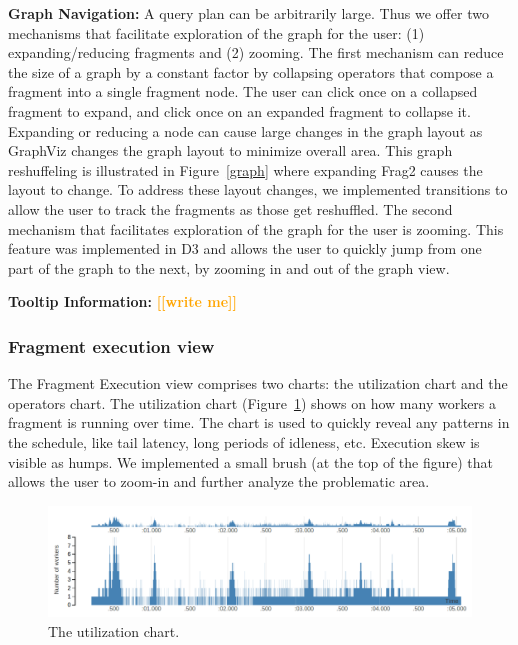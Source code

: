 \documentclass{chi2009}
\newcommand*{\fragment}{Fragment Execution\xspace}
\newcommand{\todo}[1]{\textsf{\textbf{\textcolor{Orange}{[[#1]]}}}}
\begin{document}
\textbf{Graph Navigation:} A query plan can be arbitrarily large. Thus we offer two mechanisms that facilitate exploration of the graph for the user: (1) expanding/reducing fragments and (2) zooming. The first mechanism can reduce the size of a graph by a constant factor by collapsing operators that compose a fragment into a single fragment node. The user can click once on a collapsed fragment to expand, and click once on an expanded fragment to collapse it. Expanding or reducing a node can cause large changes in the graph layout as GraphViz changes the graph layout to minimize overall area. This graph reshuffeling is illustrated in Figure~\ref{graph} where expanding Frag2 causes the layout to change. To address these layout changes, we implemented transitions to allow the user to track the fragments as those get reshuffled. The second mechanism that facilitates exploration of the graph for the user is zooming. This feature was implemented in D3 and allows the user to quickly jump from one part of the graph to the next, by zooming in and out of the graph view.

\textbf{Tooltip Information:} \todo{write me}


\subsubsection{Fragment execution view}
\label{sec:fragment}


The \fragment view comprises two charts: the utilization chart and the
operators chart. The utilization chart (Figure~\ref{fig:utilization_chart}) shows on
how many workers a fragment is running over time. The chart is used to
quickly reveal any patterns in the schedule, like tail latency, long periods of
idleness, etc. Execution skew is visible as humps.
We implemented a small brush (at the top of the figure) that
allows the user to zoom-in and further analyze the problematic area.

\begin{figure}[ht]
  \includegraphics[width=\columnwidth]{images/utilization_chart}
  \caption{The utilization chart. }
  \label{fig:utilization_chart}
\end{figure}
\end{document}
